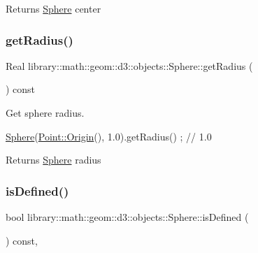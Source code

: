 \begin{DoxyReturn}{Returns}
\hyperlink{classlibrary_1_1math_1_1geom_1_1d3_1_1objects_1_1_sphere}{Sphere} center 
\end{DoxyReturn}
\mbox{\label{classlibrary_1_1math_1_1geom_1_1d3_1_1objects_1_1_sphere_a48cfc72b6eec9a953fb837a13e1df45e}} 
\subsubsection{\texorpdfstring{get\+Radius()}{getRadius()}}
{\footnotesize\ttfamily Real library\+::math\+::geom\+::d3\+::objects\+::\+Sphere\+::get\+Radius (\begin{DoxyParamCaption}{ }\end{DoxyParamCaption}) const}



Get sphere radius. 


\begin{DoxyCode}
\hyperlink{classlibrary_1_1math_1_1geom_1_1d3_1_1objects_1_1_sphere_a55dccc8ea16ee55cd7694c26afa8ea39}{Sphere}(\hyperlink{classlibrary_1_1math_1_1geom_1_1d3_1_1objects_1_1_point_ab2a38e285c562e50bf350272c083986f}{Point::Origin}(), 1.0).getRadius() ; \textcolor{comment}{// 1.0}
\end{DoxyCode}


\begin{DoxyReturn}{Returns}
\hyperlink{classlibrary_1_1math_1_1geom_1_1d3_1_1objects_1_1_sphere}{Sphere} radius 
\end{DoxyReturn}
\mbox{\label{classlibrary_1_1math_1_1geom_1_1d3_1_1objects_1_1_sphere_a0598bd75f8a34e07a3ad36cf10a7f098}} 
\subsubsection{\texorpdfstring{is\+Defined()}{isDefined()}}
{\footnotesize\ttfamily bool library\+::math\+::geom\+::d3\+::objects\+::\+Sphere\+::is\+Defined (\begin{DoxyParamCaption}{ }\end{DoxyParamCaption}) const\hspace{0.3cm}{\ttfamily [override]}, {\ttfamily [virtual]}}



